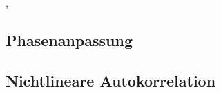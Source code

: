 \autocite{zinth}, \autocite{hecht}

    \subsection{Phasenanpassung}



    \subsection{Nichtlineare Autokorrelation}

